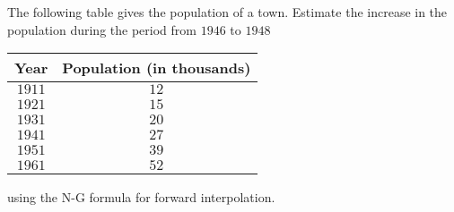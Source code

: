 \documentclass[12pt,class=book,crop=false]{standalone}
\begin{document}
\begin{prob}
    The following table gives the population of a town. Estimate the increase in the population during the period from \( 1946 \) to \( 1948 \)
    \begin{center}
        \begin{tabular}{cc}
            \toprule
            Year       & Population (in thousands) \\\midrule
            \( 1911 \) & \( 12 \)                  \\
            \( 1921 \) & \( 15 \)                  \\
            \( 1931 \) & \( 20 \)                  \\
            \( 1941 \) & \( 27 \)                  \\
            \( 1951 \) & \( 39 \)                  \\
            \( 1961 \) & \( 52 \)                  \\\bottomrule
        \end{tabular}
    \end{center}
    using the N-G formula for forward interpolation.
\end{prob}
\end{document}

